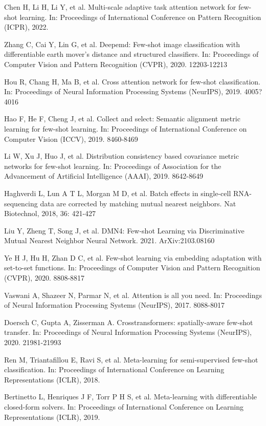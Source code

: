 \documentclass{SCIS2019}
\begin{document}
\begin{thebibliography}{99}
	 Chen H, Li H, Li Y, et al. Multi-scale adaptive task attention network for few-shot learning. In: Proceedings of International Conference on Pattern Recognition (ICPR), 2022.
	
	 Zhang C, Cai Y, Lin G, et al. Deepemd: Few-shot image classification with differentiable earth mover's distance and structured classifiers. In: Proceedings of Computer Vision and Pattern Recognition (CVPR), 2020. 12203-12213

	 Hou R, Chang H, Ma B, et al. Cross attention network for few-shot classification. In: Proceedings of Neural Information Processing Systems (NeurIPS), 2019. 4005?4016

	 Hao F, He F, Cheng J, et al. Collect and select: Semantic alignment metric learning for few-shot learning. In: Proceedings of International Conference on Computer Vision (ICCV), 2019. 8460-8469

	 Li W, Xu J, Huo J, et al. Distribution consistency based covariance metric networks for few-shot learning. In: Proceedings of Association for the Advancement of Artificial Intelligence (AAAI), 2019. 8642-8649
	
	 Haghverdi L, Lun A T L, Morgan M D, et al. Batch effects in single-cell RNA-sequencing data are corrected by matching mutual nearest neighbors. Nat Biotechnol, 2018, 36: 421-427

	 Liu Y, Zheng T, Song J, et al. DMN4: Few-shot Learning via Discriminative Mutual Nearest Neighbor Neural Network. 2021. ArXiv:2103.08160

	 Ye H J, Hu H, Zhan D C, et al. Few-shot learning via embedding adaptation with set-to-set functions. In: Proceedings of Computer Vision and Pattern Recognition (CVPR), 2020. 8808-8817

	 Vaswani A, Shazeer N, Parmar N, et al. Attention is all you need. In: Proceedings of Neural Information Processing Systems (NeurIPS), 2017. 8088-8017
	
	 Doersch C, Gupta A, Zisserman A. Crosstransformers: spatially-aware few-shot transfer. In: Proceedings of Neural Information Processing Systems (NeurIPS), 2020. 21981-21993
	
	 Ren M, Triantafillou E, Ravi S, et al. Meta-learning for semi-supervised few-shot classification. In: Proceedings of International Conference on Learning Representations (ICLR), 2018.
	 
	 Bertinetto L, Henriques J F, Torr P H S, et al. Meta-learning with differentiable closed-form solvers. In: Proceedings of International Conference on Learning Representations (ICLR), 2019.
	

\end{thebibliography}
\end{document}
